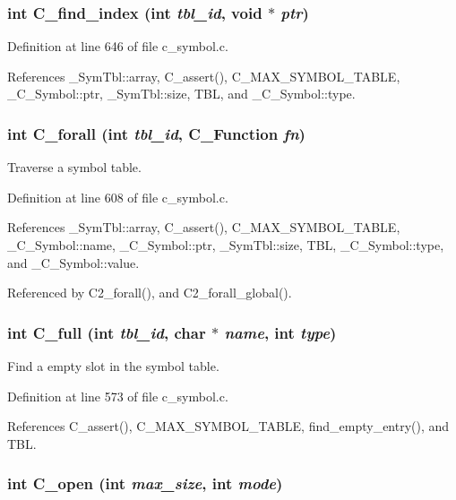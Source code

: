 \subsubsection{\setlength{\rightskip}{0pt plus 5cm}int C\_\-find\_\-index (int {\em tbl\_\-id}, void $\ast$ {\em ptr})}\label{c__symbol_8h_bafb54deffd152722f44aa5bab194a6f}




Definition at line 646 of file c\_\-symbol.c.

References \_\-Sym\-Tbl::array, C\_\-assert(), C\_\-MAX\_\-SYMBOL\_\-TABLE, \_\-C\_\-Symbol::ptr, \_\-Sym\-Tbl::size, TBL, and \_\-C\_\-Symbol::type.
\subsubsection{\setlength{\rightskip}{0pt plus 5cm}int C\_\-forall (int {\em tbl\_\-id}, \bf{C\_\-Function} {\em fn})}\label{c__symbol_8h_dce0ead9ac62b8796f3ec67b8dcd2012}


Traverse a symbol table. 

Definition at line 608 of file c\_\-symbol.c.

References \_\-Sym\-Tbl::array, C\_\-assert(), C\_\-MAX\_\-SYMBOL\_\-TABLE, \_\-C\_\-Symbol::name, \_\-C\_\-Symbol::ptr, \_\-Sym\-Tbl::size, TBL, \_\-C\_\-Symbol::type, and \_\-C\_\-Symbol::value.

Referenced by C2\_\-forall(), and C2\_\-forall\_\-global().
\subsubsection{\setlength{\rightskip}{0pt plus 5cm}int C\_\-full (int {\em tbl\_\-id}, char $\ast$ {\em name}, int {\em type})}\label{c__symbol_8h_b5f3bc613574a44dae7d72a5a97b2f5c}


Find a empty slot in the symbol table. 

Definition at line 573 of file c\_\-symbol.c.

References C\_\-assert(), C\_\-MAX\_\-SYMBOL\_\-TABLE, find\_\-empty\_\-entry(), and TBL.
\subsubsection{\setlength{\rightskip}{0pt plus 5cm}int C\_\-open (int {\em max\_\-size}, int {\em mode})}\label{c__symbol_8h_9e31694a4ba6f29b591504e7442671af}


